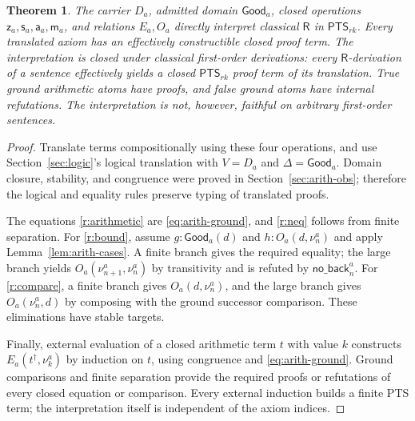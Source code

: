 \documentclass[11pt,a4paper]{article}
\newcommand{\PTS}{\mathsf{PTS}_{rk}}
\newcommand{\R}{\mathsf R}
\newcommand{\Da}{D_{\!a}}
\newcommand{\za}{\mathsf z_a}
\newcommand{\sa}{\mathsf s_a}
\newcommand{\adda}{\mathsf a_a}
\newcommand{\ma}{\mathsf m_a}
\newcommand{\Ea}{E_a}
\newcommand{\Oa}{O_a}
\newcommand{\Gooda}{\mathsf{Good}_a}
\newcommand{\nua}[1]{\nu^{a}_{#1}}
\newtheorem{theorem}[lemma]{Theorem}
\theoremstyle{remark}\newtheorem*{remark}{Remark}
\begin{document}
\begin{theorem}\label{thm:direct-R}
The carrier $\Da$, admitted domain $\Gooda$, closed operations
$\za,\sa,\adda,\ma$, and relations $\Ea,\Oa$ directly interpret classical
$\R$ in $\PTS$. Every translated axiom has an effectively constructible
closed proof term. The interpretation is closed under classical first-order
derivations: every $\R$-derivation of a sentence effectively yields a closed
$\PTS$ proof term of its translation. True ground arithmetic atoms have
proofs, and false ground atoms have internal refutations. The interpretation
is not, however, faithful on arbitrary first-order sentences.
\end{theorem}
\begin{proof}
Translate terms compositionally using these four operations, and use
Section~\ref{sec:logic}'s logical translation with $V=\Da$ and
$\Delta=\Gooda$. Domain closure, stability, and congruence were proved in
Section~\ref{sec:arith-obs}; therefore the logical and equality rules
preserve typing of translated proofs.

The equations \eqref{r:arithmetic} are \eqref{eq:arith-ground}, and
\eqref{r:neq} follows from finite separation. For \eqref{r:bound}, assume
$g:\Gooda(d)$ and $h:\Oa(d,\nua n)$ and apply
Lemma~\ref{lem:arith-cases}. A finite branch gives the required equality;
the large branch yields $\Oa(\nua{n+1},\nua n)$ by transitivity and is
refuted by $\mathsf{no\_back}^{a}_n$. For \eqref{r:compare}, a finite
branch gives $\Oa(d,\nua n)$, and the large branch gives
$\Oa(\nua n,d)$ by composing with the ground successor comparison.
These eliminations have stable targets.

Finally, external evaluation of a closed arithmetic term $t$ with value
$k$ constructs $\Ea(t^\dagger,\nua k)$ by induction on $t$, using
congruence and \eqref{eq:arith-ground}. Ground comparisons and finite
separation provide the required proofs or refutations of every closed
equation or comparison. Every external induction builds a finite PTS
term; the interpretation itself is independent of the axiom indices.
\end{proof}

\end{document}
